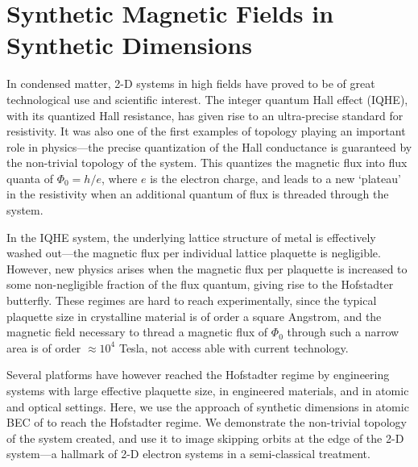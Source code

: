 \renewcommand{\thechapter}{6}

\chapter{Synthetic Magnetic Fields in Synthetic Dimensions}\label{chap:SynDim}


In condensed matter, 2-D systems in high fields have proved to be of great technological use and scientific interest. The integer quantum Hall effect (IQHE)\cite{Klitzing1980}, with its quantized Hall resistance, has given rise to an ultra-precise standard for resistivity. It was also one of the first examples of topology playing an important role in physics---the precise quantization of the Hall conductance is guaranteed by the non-trivial topology of the system\cite{Thouless1982}. This quantizes the magnetic flux into flux quanta of $\Phi_0=h/e$, where $e$ is the electron charge, and leads to a new \lq{plateau}\rq{} in the resistivity when an additional quantum of flux is threaded through the system. 

In the IQHE system, the underlying lattice structure of metal is effectively washed out---the magnetic flux per individual lattice plaquette is negligible. However, new physics arises when the magnetic flux per plaquette is increased to some non-negligible fraction of the flux quantum, giving rise to the Hofstadter butterfly\cite{Hofstadter1976}. These regimes are hard to reach experimentally, since the typical plaquette size in crystalline material is of order a square Angstrom, and the magnetic field necessary to thread a magnetic flux of $\Phi_0$ through such a narrow area is of order $\approx10^4$ Tesla, not access able with current technology. 

Several platforms have however reached the Hofstadter regime by engineering systems with large effective plaquette size, in engineered materials\cite{Geisler2004,Hunt2013}, and in atomic\cite{Jaksch2003,Aidelsburger2013,Miyake2013,Jotzu2014,Aidelsburger2014,Mancini2015} and optical\cite{Hafezi2013} settings. Here, we use the approach of synthetic dimensions \cite{Celi2014} in atomic BEC of \Rb{} to reach the Hofstadter regime. We demonstrate the non-trivial topology of the system created, and use it to image skipping orbits at the edge of the 2-D system---a hallmark of 2-D electron systems in a semi-classical treatment. 

